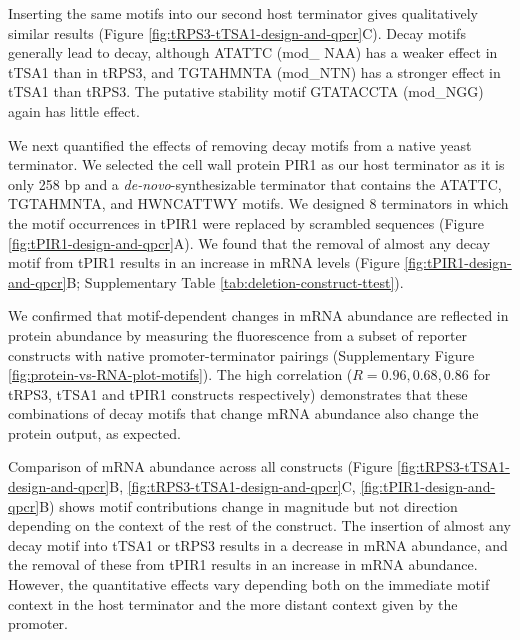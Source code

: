 \documentclass[../main.tex]{subfiles}
\begin{document}
Inserting the same motifs into our second host terminator gives qualitatively similar results (Figure \ref{fig:tRPS3-tTSA1-design-and-qpcr}C).
Decay motifs generally lead to decay, although ATATTC (mod\_ NAA) has a weaker effect in tTSA1 than in tRPS3, and TGTAHMNTA (mod\_NTN) has a stronger effect in tTSA1 than tRPS3.
The putative stability motif GTATACCTA (mod\_NGG) again has little effect.

We next quantified the effects of removing decay motifs from a native yeast terminator.
We selected the cell wall protein PIR1 as our host terminator as it is only 258 bp \parencite{Pelechano2013} and a \emph{de-novo}-synthesizable terminator that contains the ATATTC, TGTAHMNTA, and HWNCATTWY motifs.
We designed 8 terminators in which the motif occurrences in tPIR1 were replaced by scrambled sequences (Figure \ref{fig:tPIR1-design-and-qpcr}A).
We found that the removal of almost any decay motif from tPIR1 results in an increase in mRNA levels (Figure \ref{fig:tPIR1-design-and-qpcr}B; Supplementary Table \ref{tab:deletion-construct-ttest}).

We confirmed that motif-dependent changes in mRNA abundance are reflected in protein abundance by measuring the fluorescence from a subset of reporter constructs with native promoter-terminator pairings (Supplementary Figure \ref{fig:protein-vs-RNA-plot-motifs}).
The high correlation (\(R = 0.96, 0.68, 0.86\) for tRPS3, tTSA1 and tPIR1 constructs respectively) demonstrates that these combinations of decay motifs that change mRNA abundance also change the protein output, as expected.

Comparison of mRNA abundance across all constructs (Figure \ref{fig:tRPS3-tTSA1-design-and-qpcr}B, \ref{fig:tRPS3-tTSA1-design-and-qpcr}C, \ref{fig:tPIR1-design-and-qpcr}B) shows motif contributions change in magnitude but not direction depending on the context of the rest of the construct.
The insertion of almost any decay motif into tTSA1 or tRPS3 results in a decrease in mRNA abundance, and the removal of these from tPIR1 results in an increase in mRNA abundance.
However, the quantitative effects vary depending both on the immediate motif context in the host terminator and the more distant context given by the promoter.
\end{document}
